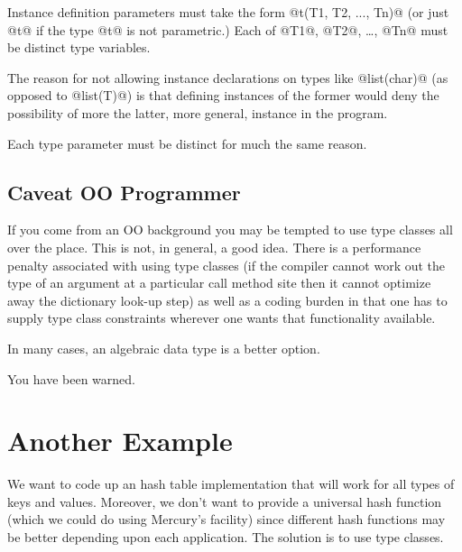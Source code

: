 Instance definition parameters must take the form @t(T1, T2, ..., Tn)@
(or just @t@ if the type @t@ is not parametric.)  Each of @T1@, @T2@,
\ldots, @Tn@ must be distinct type variables.

The reason for not allowing instance declarations on types like
@list(char)@ (as opposed to @list(T)@) is that defining instances of the
former would deny the possibility of more the latter, more general,
instance in the program.

Each type parameter must be distinct for much the same reason.

\subsection{Caveat OO Programmer}


If you come from an OO background you may be tempted to use type
classes all over the place.  This is not, in general, a good idea.
There is a performance penalty associated with using type classes (if
the compiler cannot work out the type of an argument at a particular
call method site then it cannot optimize away the dictionary look-up
step) as well as a coding burden in that one has to supply type class
constraints wherever one wants that functionality available.

In many cases, an algebraic data type is a better option.

You have been warned.

\section{Another Example}

We want to code up an hash table implementation that will work for all
types of keys and values.  Moreover, we don't want to provide a
universal hash function (which we could do using Mercury's 
facility) since different hash functions may be better depending upon
each application.  The solution is to use type classes.

